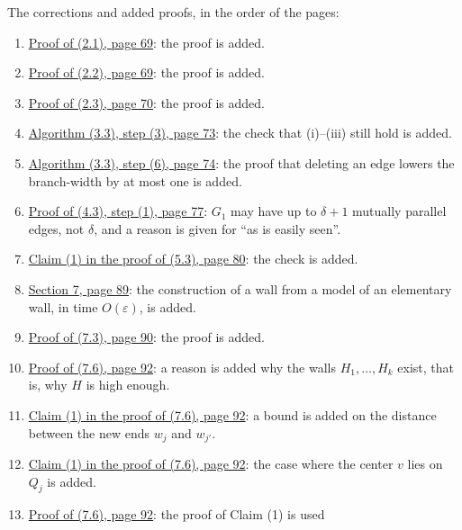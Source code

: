 The corrections and added proofs, in the order of the pages:
\begin{enumerate}\setlength{\itemsep}{1pt}
\item {}\hyperref[fix:2.1-proof-added]{Proof of (2.1), page 69}: the proof is added.
\item {}\hyperref[fix:2.2-proof-added]{Proof of (2.2), page 69}: the proof is added.
\item {}\hyperref[fix:2.3-proof-added]{Proof of (2.3), page 70}: the proof is added.
\item {}\hyperref[fix:3.3-step3-proof-added]{Algorithm (3.3), step (3), page 73}: the check that
(i)--(iii) still hold is added.
\item {}\hyperref[fix:3.3-step6-proof-added]{Algorithm (3.3), step (6), page 74}: the proof that
deleting an edge lowers the branch-width by at most one is added.
\item {}\hyperref[fix:4.3-proof]{Proof of (4.3), step (1), page 77}: $G_1$ may have up to
$\delta + 1$ mutually parallel edges, not $\delta$, and a reason is given for ``as is easily
seen''.
\item {}\hyperref[fix:5.3-claim1-proof-added]{Claim (1) in the proof of (5.3), page 80}: the
check is added.
\item {}\hyperref[fix:7-wall-proof-added]{Section 7, page 89}: the construction of a wall from a
model of an elementary wall, in time $O(\varepsilon)$, is added.
\item {}\hyperref[fix:7.3-proof-added]{Proof of (7.3), page 90}: the proof is added.
\item {}\hyperref[fix:7.6-height]{Proof of (7.6), page 92}: a reason is added why the walls
$H_1, \dots, H_k$ exist, that is, why $H$ is high enough.
\item {}\hyperref[fix:7.6-claim1-dist]{Claim (1) in the proof of (7.6), page 92}: a bound is added
on the distance between the new ends $w_j$ and $w_{j'}$.
\item {}\hyperref[fix:7.6-claim1-center]{Claim (1) in the proof of (7.6), page 92}: the case where
the center $v$ lies on $Q_j$ is added.
\item {}\hyperref[fix:7.6-claim1-use]{Proof of (7.6), page 92}: the proof of Claim (1) is used

\end{enumerate}
